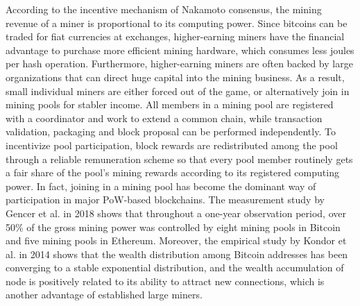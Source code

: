 According to the incentive mechanism of Nakamoto consensus, the mining revenue of a miner is proportional to its computing power.
Since bitcoins can be traded for fiat currencies at exchanges, higher-earning miners have the financial advantage to purchase more efficient mining hardware, which consumes less joules per hash operation. Furthermore, higher-earning miners are often backed by large organizations that can direct huge capital into the mining business. As a result, small individual miners are either forced out of the game, or alternatively join in mining pools for stabler income. All members in a mining pool are registered with a coordinator and work to extend a common chain, while transaction validation, packaging and block proposal can be performed independently.  
{\color{\rrcolor}
To incentivize pool participation, block rewards are redistributed among the pool through a reliable remuneration scheme so that every pool member routinely gets a fair share of the pool's mining rewards according to its registered computing power.
}
In fact, joining in a mining pool has become the dominant way of participation in major PoW-based blockchains.
The measurement study by Gencer et al.  in 2018 shows that throughout a one-year observation period, over 50\% of the gross mining power was controlled by eight mining pools in Bitcoin and five mining pools in Ethereum.
Moreover, the empirical study by Kondor et al.  in 2014 shows that the wealth distribution among Bitcoin addresses has been converging to a stable exponential distribution, and the wealth accumulation of node is positively related to its ability to attract new connections, which is another advantage of established large miners.



